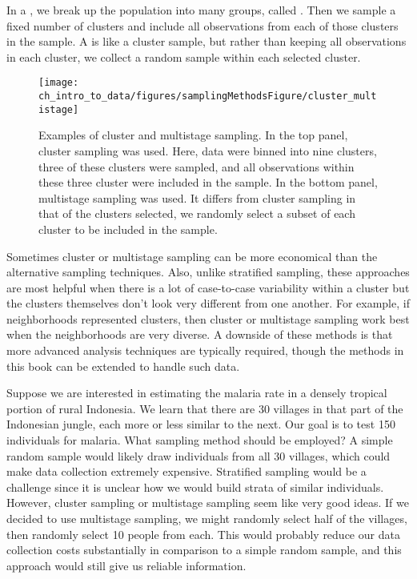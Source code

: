 In a , we break up the population into many groups, called . Then we sample a fixed number of clusters and include all observations from each of those clusters in the sample. A  is like a cluster sample, but rather than keeping all observations in each cluster, we collect a random sample within each selected cluster. %

\begin{figure}
\centering
\texttt{[image: ch\_intro\_to\_data/figures/samplingMethodsFigure/cluster\_multistage]}
\caption{Examples of cluster and multistage sampling. In the top panel, cluster sampling was used. Here, data were binned into nine clusters, three of these clusters were sampled, and all observations within these three cluster were included in the sample. In the bottom panel, multistage sampling was used.
It differs from cluster sampling in that of the clusters selected, we randomly select a subset of each cluster to be included in the sample.}
\label{cluster_multistage}
\end{figure}

Sometimes cluster or multistage sampling can be more economical than the alternative sampling techniques. Also, unlike stratified sampling, these approaches are most helpful when there is a lot of case-to-case variability within a cluster but the clusters themselves don't look very different from one another. For example, if neighborhoods represented clusters, then cluster or multistage sampling work best when the neighborhoods are very diverse. A downside of these methods is that more advanced analysis techniques are typically required, though the methods in this book can be extended to handle such data.

\begin{example}{Suppose we are interested in estimating the malaria rate in a densely tropical portion of rural Indonesia. We learn that there are 30 villages in that part of the Indonesian jungle, each more or less similar to the next. Our goal is to test 150 individuals for malaria. What sampling method should be employed?}
A simple random sample would likely draw individuals from all 30 villages, which could make data collection extremely expensive. Stratified sampling would be a challenge since it is unclear how we would build strata of similar individuals. However, cluster sampling or multistage sampling seem like very good ideas. If we decided to use multistage sampling, we might randomly select half of the villages, then randomly select 10 people from each. This would probably reduce our data collection costs substantially in comparison to a simple random sample, and this approach would still give us reliable information.
\end{example}


